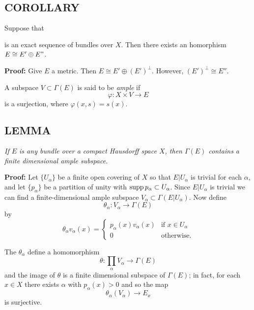 \subsection{COROLLARY}\label{cor:1.4.11} Suppose that  is an exact sequence of bundles over $X$. Then there exists an homorphism $E \cong E' \oplus E"$. \par 

\textbf{Proof:} Give $E$ a metric. Then $E \cong E' \oplus (E')^\bot$. However, $(E')^\bot \cong E''$. \par \hfill

A subspace $V \subset \Gamma(E)$ is said to be \textit{ample} if
\begin{equation*}
    \varphi: X \times V \to E
\end{equation*}
is a surjection, where $\varphi(x, s) = s(x)$.

\subsection{LEMMA}\label{lem:1.4.12} \textit{If $E$ is any bundle over a compact Hausdorff space $X$, then $\Gamma(E)$ contains a finite dimensional ample subspace.} \par 

\textbf{Proof:} Let $\{U_\alpha\}$ be a finite open covering of $X$ so that $E \vert U_\alpha$ is trivial for each $\alpha$, and let $\{p_\alpha\}$ be a partition of unity with $\operatorname{supp} p_\alpha \subset U_\alpha$. Since $E \vert U_\alpha$ is trivial we can find a finite-dimensional ample subspace $V_\alpha \subset \Gamma(E \vert U_\alpha)$. Now define
\begin{equation*}
    \theta_\alpha: V_\alpha \to \Gamma(E)
\end{equation*}
by
\begin{equation*}
\theta_\alpha v_\alpha(x) =
    \begin{cases}
        p_\alpha(x) v_\alpha(x) & \text{if $x \in U_\alpha$} \\
        0 & \text{otherwise.}
    \end{cases}
\end{equation*}

The $\theta_\alpha$ define a homomorphism
\begin{equation*}
    \theta: \prod_\alpha V_\alpha \to \Gamma(E)
\end{equation*}
and the image of $\theta$ is a finite dimensional subspace of $\Gamma(E)$; in fact, for each $x \in X$ there exists $\alpha$ with $p_\alpha(x) > 0$ and so the map
\begin{equation*}
    \theta_\alpha(V_\alpha) \to E_x
\end{equation*}
is surjective. \par 


